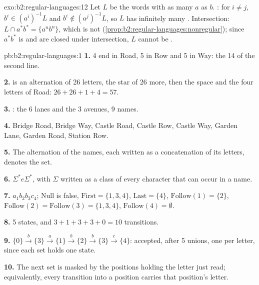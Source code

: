 \begin{solution}{exo:b2:regular-languages:12}
Let $L$ be the words with as many $a$ as $b$. : for $i \ne j$, $b^i \in (a^i)^{-1}L$ and $b^i \notin
(a^j)^{-1}L$, so $L$ has infinitely many . Intersection: $L \cap a^*b^* = \{a^nb^n\}$, which is not 
(\cref{prop:b2:regular-languages:nonregular}); since $a^*b^*$ is  and  are closed under
intersection, $L$ cannot be .
\end{solution}

\begin{solution}{pb:b2:regular-languages:1}
\textbf{1.} 4 end in Road, 5 in Row and 5 in Way: the 14 of the second line.

\textbf{2.} \code{[A-Z]} is an alternation of 26 letters, \code{[a-z]*} the star of 26 more, then the space and the
four letters of Road: $26 + 26 + 1 + 4 = 57$.

\textbf{3.} : the 6 lanes and the 3 avenues, 9 names.

\textbf{4.} Bridge Road, Bridge Way, Castle Road, Castle Row, Castle Way, Garden Lane, Garden Road, Station Row.

\textbf{5.} The alternation of the names, each written as a concatenation of its letters, denotes the set.

\textbf{6.} $\Sigma^* e \Sigma^*$, with $\Sigma$ written as a class of every character that can occur in a name.

\textbf{7.} $a_1 b_2 b_3 c_4$; $\mathrm{Null}$ is false, $\mathrm{First} = \{1, 3, 4\}$, $\mathrm{Last} = \{4\}$,
$\mathrm{Follow}(1) = \{2\}$, $\mathrm{Follow}(2) = \mathrm{Follow}(3) = \{1, 3, 4\}$, $\mathrm{Follow}(4) =
\emptyset$.

\textbf{8.} 5 states, and $3 + 1 + 3 + 3 + 0 = 10$ transitions.

\textbf{9.} $\{0\} \xrightarrow{b} \{3\} \xrightarrow{a} \{1\} \xrightarrow{b} \{2\} \xrightarrow{b} \{3\}
\xrightarrow{c} \{4\}$: accepted, after 5 unions, one per letter, since each set holds one state.

\textbf{10.} The next set is masked by the positions holding the letter just read; equivalently, every transition into
a position carries that position's letter.


\end{solution}
